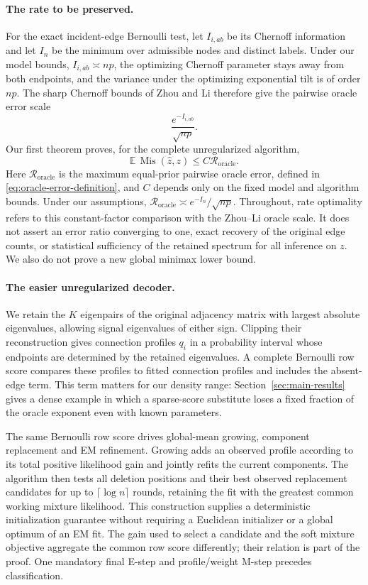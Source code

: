 \documentclass[11pt]{article}
\theoremstyle{definition}
\theoremstyle{remark}
\newcommand{\Mis}{\operatorname{Mis}}
\newcommand{\Roracle}{\mathcal R_{\mathrm{oracle}}}
\numberwithin{equation}{section}
\begin{document}
\paragraph{The rate to be preserved.}
For the exact incident-edge Bernoulli test, let $I_{i,ab}$ be its Chernoff information and let $I_n$ be the minimum over admissible nodes and distinct labels. Under our model bounds, $I_{i,ab}\asymp np$, the optimizing Chernoff parameter stays away from both endpoints, and the variance under the optimizing exponential tilt is of order $np$. The sharp Chernoff bounds of Zhou and Li \cite{zhouli2020} therefore give the pairwise oracle error scale
\[
 \frac{e^{-I_{i,ab}}}{\sqrt{np}}.
\]
Our first theorem proves, for the complete unregularized algorithm,
\begin{equation}
 \mathbb E\,\Mis(\widehat z,z)
 \le C\Roracle.
 \label{eq:intro-sharp-rate}
\end{equation}
Here $\Roracle$ is the maximum equal-prior pairwise oracle error, defined in \eqref{eq:oracle-error-definition}, and $C$ depends only on the fixed model and algorithm bounds. Under our assumptions, $\Roracle\asymp e^{-I_n}/\sqrt{np}$. Throughout, rate optimality refers to this constant-factor comparison with the Zhou--Li oracle scale. It does not assert an error ratio converging to one, exact recovery of the original edge counts, or statistical sufficiency of the retained spectrum for all inference on $z$. We also do not prove a new global minimax lower bound.

\paragraph{The easier unregularized decoder.}
We retain the $K$ eigenpairs of the original adjacency matrix with largest absolute eigenvalues, allowing signal eigenvalues of either sign. Clipping their reconstruction gives connection profiles $q_i$ in a probability interval whose endpoints are determined by the retained eigenvalues. A complete Bernoulli row score compares these profiles to fitted connection profiles and includes the absent-edge term. This term matters for our density range: Section~\ref{sec:main-results} gives a dense example in which a sparse-score substitute loses a fixed fraction of the oracle exponent even with known parameters.

The same Bernoulli row score drives global-mean growing, component replacement and EM refinement. Growing adds an observed profile according to its total positive likelihood gain and jointly refits the current components. The algorithm then tests all deletion positions and their best observed replacement candidates for up to $\lceil\log n\rceil$ rounds, retaining the fit with the greatest common working mixture likelihood. This construction supplies a deterministic initialization guarantee without requiring a Euclidean initializer or a global optimum of an EM fit. The gain used to select a candidate and the soft mixture objective aggregate the common row score differently; their relation is part of the proof. One mandatory final E-step and profile/weight M-step precedes classification.
\end{document}
